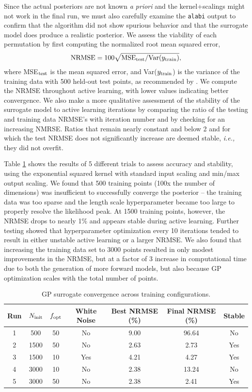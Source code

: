 \documentclass[preprint]{aastex631}
\def\ie{{\it i.e., }}
\def\alabi{\texttt{\footnotesize{alabi}}\xspace}
\begin{document}
Since the actual posteriors are not known {\it a priori} and the kernel+scalings might not work in the final run, we must also carefully examine the \alabi output to confirm that the algorithm did not show spurious behavior and that the surrogate model does produce a realistic posterior. We assess the viability of each permutation by first computing the normalized root mean squared error,
\begin{equation}
\label{eq:nmrse}
\mathrm{NRMSE} =  100\sqrt{{\rm MSE}_{\rm test}/{\rm Var}(y_{\rm train})},
\end{equation}
where MSE$_{\rm test}$ is the mean squared error, and Var($y_{\rm train}$) is the variance of the training data with 500 held-out test points, as recommended by \citet{BirkyBarnes25}. We compute the NRMSE  throughout active learning, with lower values indicating better convergence. We also make a more qualitative assessment of the stability of the surrogate model to active learning iterations by comparing the ratio of the testing and training data NRMSE's with iteration number and by checking for an increasing NMRSE. Ratios that remain nearly constant and below 2 and for which the test NRMSE does not significantly increase are deemed stable, \ie they did not overfit.

Table \ref{tab:convergence} shows the results of 5 different trials to assess accuracy and stability, using the exponential squared kernel with standard input scaling and min/max output scaling. We found that 500 training points (100x the number of dimensions) was insufficient to successfully converge the posterior -- the training data was too sparse and the length scale hyperparameter became too large to properly resolve the likelihood peak. At 1500 training points, however, the NRMSE drops to nearly 1\% and appears stable during active learning. Further testing showed that hyperparameter optimization every 10 iterations tended to result in either unstable active learning or a larger NRMSE. We also found that increasing the training data set to 3000 points resulted in only modest improvements in the NRMSE, but at a factor of 3 increase in computational time due to both the generation of more forward models, but also because GP optimization scales with the total number of points.

\begin{table}
\centering
\caption{GP surrogate convergence across training configurations.}
\label{tab:convergence}
\begin{tabular}{ccccccc}
\hline
Run & $N_{\rm init}$ & $f_{\rm opt}$ & White Noise & Best NRMSE (\%) & Final NRMSE (\%) & Stable \\
\hline
1 & 500  & 50 & No  &  9.00 & 96.64 & No  \\
2 & 1500 & 50 & No  &  2.63 &  2.73 & Yes \\
3 & 1500 & 10 & Yes &  4.21 &  4.27 & Yes \\
4 & 3000 & 10 & No  &  2.38 & 13.24 & No  \\
5 & 3000 & 50 & No  &  2.38 &  2.41 & Yes \\
\hline
\end{tabular}
\end{table}
\end{document}
